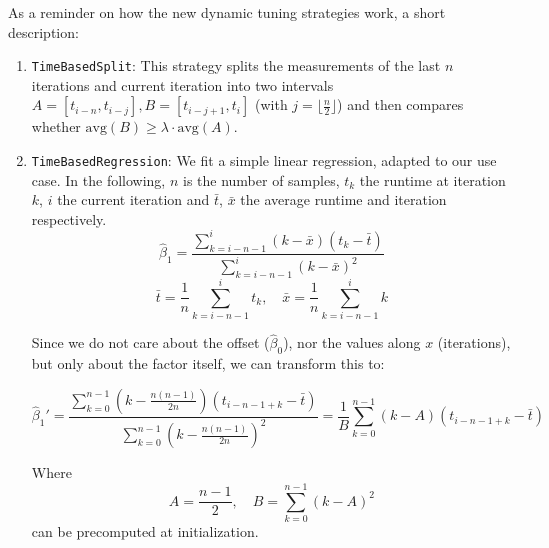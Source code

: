 \documentclass[]{article}
\begin{document}
As a reminder on how the new dynamic tuning strategies work, a short description:
\begin{enumerate}
	\item \texttt{TimeBasedSplit}:
	      This strategy splits the measurements of the last $n$ iterations and current iteration into two intervals $A = [t_{i-n}, t_{i-j}], B=[t_{i-j+1},t_i]$ (with $j=\lfloor\frac{n}{2}\rfloor$) and then compares whether $\text{avg}(B)\ge \lambda\cdot \text{avg}(A)$.

	\item \texttt{TimeBasedRegression}:
	      We fit a simple linear regression, adapted to our use case. In the following, $n$ is the number of samples, $t_k$ the runtime at iteration $k$, $i$ the current iteration and $\bar t$, $\bar x$ the average runtime and iteration respectively.
	      \[
		      \hat{\beta}_1 =
		      \frac{\sum_{k=i-n-1}^{i}(k-\bar x)(t_k-\bar t)}{\sum_{k=i-n-1}^{i}(k-\bar x)^2}
	      \]
	      \[
		      \bar t = \frac{1}{n}\sum_{k=i-n-1}^it_k, \quad \bar x = \frac{1}{n}\sum_{k=i-n-1}^ik
	      \]

	      Since we do not care about the offset ($\hat\beta_0$), nor the values along $x$ (iterations), but only about the factor itself, we can transform this to:

	      \[
		      \hat{\beta}_1' =
		      \frac{\sum_{k=0}^{n-1}\left(k-\frac{n(n-1)}{2n}\right)(t_{i-n-1+k}-\bar t)}{\sum_{k=0}^{n-1}\left(k-\frac{n(n-1)}{2n}\right)^2}
		      = \frac{1}{B}\sum_{k=0}^{n-1}\left(k-A\right)(t_{i-n-1+k}-\bar t)
	      \]

	      Where
	      \[ A = \frac{n-1}{2}, \quad B=\sum_{k=0}^{n-1}\left(k-A\right)^2\]
	      can be precomputed at initialization.


\end{enumerate}
\end{document}
